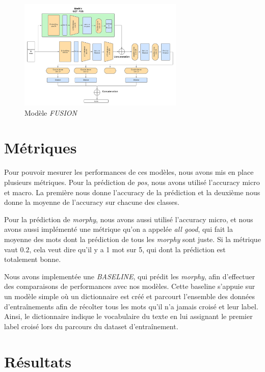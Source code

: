 \documentclass[a4paper]{article}
\begin{document}
\begin{figure}[H]
    \centering
    \includegraphics[width=0.7\textwidth]{get_morphy_fusion.png}
    \caption{Modèle \textit{FUSION}}
    \label{fig: model fusion}
\end{figure}


\section{Métriques}

Pour pouvoir mesurer les performances de ces modèles, nous avons mis en place plusieurs métriques. Pour la prédiction de 
\textit{pos}, nous avons utilisé l'accuracy micro et macro. La première nous donne l'accuracy de la prédiction et la deuxième
nous donne la moyenne de l'accuracy sur chacune des classes. 

Pour la prédiction de \textit{morphy}, nous avons aussi utilisé l'accuracy micro, et nous avons aussi implémenté une 
métrique qu'on a appelée \textit{all good}, qui fait la moyenne des mots dont la prédiction de tous les \textit{morphy}
sont juste. Si la métrique vaut $0.2$, cela veut dire qu'il y a 1 mot sur 5, qui dont la prédiction est totalement bonne.

Nous avons implementée une \textit{BASELINE}, qui prédit les \textit{morphy}, afin d'effectuer des comparaisons de performances avec nos modèles.
Cette baseline s'appuie sur un modèle simple où un dictionnaire est créé et parcourt l'ensemble des données d'entraînements afin de 
récolter tous les mots qu'il n'a jamais croisé et leur label. Ainsi, le dictionnaire indique le vocabulaire du texte en lui assignant
le premier label croisé lors du parcours du dataset d'entraînement.

\section{Résultats}
\end{document}
